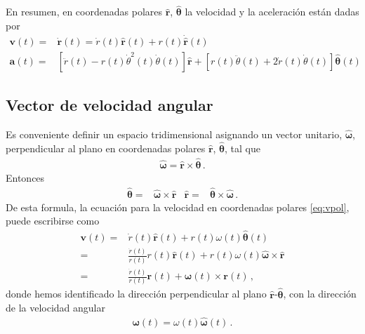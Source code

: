 \begin{frame}
  En resumen, en coordenadas polares $\hat{\mathbf{r}}$, $\hat{\boldsymbol{\theta}}$ la velocidad y la aceleración están dadas por
\begin{align*}
   \mathbf{v}(t)=&\dot{\mathbf{r}}(t)=\dot{r}(t)\hat{\mathbf{r}}(t)+
r(t)\dot{\hat{\mathbf{r}}}(t)\nonumber\\
 \mathbf{a}(t)=&
\left[\ddot{r}(t)-r(t)\dot{\theta}^2(t)\dot{\theta}(t)\right]\hat{\mathbf{r}} 
+\left[r(t)\ddot{\theta}(t)+2\dot{r}(t)\dot{\theta}(t)  \right]\hat{\boldsymbol{\theta}}(t)
\end{align*}
\end{frame}

\subsection{Vector de velocidad angular}

Es conveniente definir un espacio tridimensional asignando un vector unitario,
$\hat{\boldsymbol{\omega}}$, perpendicular al plano en coordenadas polares
$\hat{\mathbf{r}}$, $\hat{\boldsymbol{\theta}}$, tal que
\begin{align*}
  \hat{\boldsymbol{\omega}}=\hat{\mathbf{r}}\times \hat{\boldsymbol{\theta}}\,.
\end{align*}
Entonces
\begin{align*}
 \hat{\boldsymbol{\theta}}=&\hat{\boldsymbol{\omega}}\times\hat{\mathbf{r}}& \hat{\mathbf{r}}=&\hat{\boldsymbol{\theta}}\times\hat{\boldsymbol{\omega}}\,.
\end{align*}
De esta formula, la ecuación para la velocidad en coordenadas polares \eqref{eq:vpol}, puede escribirse como
\begin{align}
    \mathbf{v}(t)
  =&\dot{r}(t)\hat{\mathbf{r}}(t)+r(t)\omega(t)\hat{\boldsymbol{\theta}}(t)\nonumber\\
  =&\frac{\dot{r}(t)}{r(t)}r(t)\hat{\mathbf{r}}(t)+r(t)\omega(t)\hat{\boldsymbol{\omega}}\times\hat{\mathbf{r}}\nonumber\\
  =&\frac{\dot{r}(t)}{r(t)}\mathbf{r}(t)+\boldsymbol{\omega}(t)\times\mathbf{r}(t)\,,
\end{align}
donde hemos identificado la dirección perpendicular al plano $\hat{\mathbf{r}}$-$\hat{\boldsymbol{\theta}}$, con la dirección de la velocidad angular
\begin{align}
  \boldsymbol{\omega}(t)=\omega(t)\hat{\boldsymbol{\omega}}(t)\,.
\end{align}




